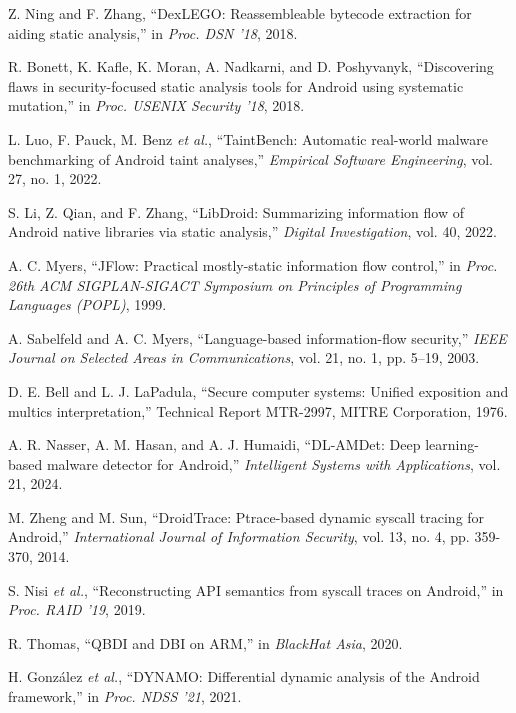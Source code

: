 \documentclass[a4paper,12pt]{report}
\begin{document}
\begin{thebibliography}{99}
Z. Ning and F. Zhang, “DexLEGO: Reassembleable bytecode extraction for aiding static analysis,” in \emph{Proc. DSN '18}, 2018.

R. Bonett, K. Kafle, K. Moran, A. Nadkarni, and D. Poshyvanyk, “Discovering flaws in security-focused static analysis tools for Android using systematic mutation,” in \emph{Proc. USENIX Security '18}, 2018.

L. Luo, F. Pauck, M. Benz \emph{et al.}, “TaintBench: Automatic real-world malware benchmarking of Android taint analyses,” \emph{Empirical Software Engineering}, vol. 27, no. 1, 2022.

S. Li, Z. Qian, and F. Zhang, “LibDroid: Summarizing information flow of Android native libraries via static analysis,” \emph{Digital Investigation}, vol. 40, 2022.

A. C. Myers, “JFlow: Practical mostly-static information flow control,” in \emph{Proc. 26th ACM SIGPLAN-SIGACT Symposium on Principles of Programming Languages (POPL)}, 1999.

A. Sabelfeld and A. C. Myers, “Language-based information-flow security,” \emph{IEEE Journal on Selected Areas in Communications}, vol. 21, no. 1, pp. 5–19, 2003.

D. E. Bell and L. J. LaPadula, “Secure computer systems: Unified exposition and multics interpretation,” Technical Report MTR-2997, MITRE Corporation, 1976.

A. R. Nasser, A. M. Hasan, and A. J. Humaidi, “DL-AMDet: Deep learning-based malware detector for Android,” \emph{Intelligent Systems with Applications}, vol. 21, 2024.

M. Zheng and M. Sun, “DroidTrace: Ptrace-based dynamic syscall tracing for Android,” \emph{International Journal of Information Security}, vol. 13, no. 4, pp. 359-370, 2014.

S. Nisi \emph{et al.}, “Reconstructing API semantics from syscall traces on Android,” in \emph{Proc. RAID '19}, 2019.

R. Thomas, “QBDI and DBI on ARM,” in \emph{BlackHat Asia}, 2020.

H. González \emph{et al.}, “DYNAMO: Differential dynamic analysis of the Android framework,” in \emph{Proc. NDSS '21}, 2021.


\end{thebibliography}
\end{document}
